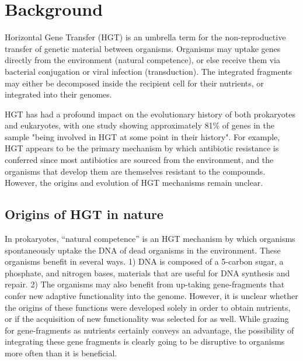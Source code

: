 \documentclass[PhD]{msu-thesis}
\begin{document}
\section{Background}


Horizontal Gene Transfer (HGT) is an umbrella term for the non-reproductive transfer of genetic material between organisms. Organisms may uptake genes directly from the environment (natural competence\cite{chen_dna_2004}), or else receive them via bacterial conjugation\cite{lederberg_gene_1946} or viral infection (transduction\cite{zinder_genetic_1952,lennox_transduction_1955}). The integrated fragments may either be decomposed inside the recipient cell for their nutrients, or integrated into their genomes. 

HGT has had a profound impact on the evolutionary history of both prokaryotes and eukaryotes, with one study showing approximately 81\% of genes in the sample "being involved in HGT at some point in their history"\cite{dagan_modular_2008}. For example, HGT appears to be the primary mechanism by which antibiotic resistance is conferred \cite{davies_origins_1997,martinez_antibiotics_2008} since most antibiotics are sourced from the environment, and the organisms that develop them are themselves resistant to the compounds.
However, the origins and evolution of HGT mechanisms remain unclear. 



\subsection{Origins of HGT in nature}
In prokaryotes, “natural competence” is an HGT mechanism by which organisms spontaneously uptake the DNA of dead organisms in the environment. These organisms benefit in several ways. 1) DNA is composed of a 5-carbon sugar, a phosphate, and nitrogen bases, materials that are useful for DNA synthesis and repair. 2) The organisms may also benefit from up-taking gene-fragments that confer new adaptive functionality into the genome\cite{vos_why_2009}. However, it is unclear whether the origins of these functions were developed solely in order to obtain nutrients, or if the acquisition of new functionality was selected for as well. While grazing for gene-fragments as nutrients certainly conveys an advantage, the possibility of integrating these gene fragments is clearly going to be disruptive to organisms more often than it is beneficial\cite{redfield_evolution_1997}. 
\end{document}
